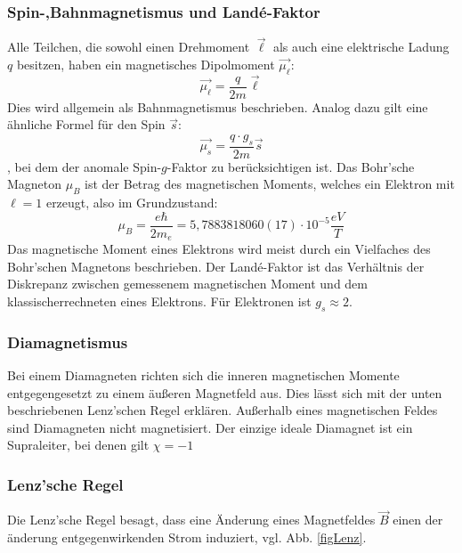         \subsubsection*{Spin-,Bahnmagnetismus und Land\'e-Faktor}
            Alle Teilchen, die sowohl einen Drehmoment $\vec{\ell}$ als auch eine elektrische Ladung $q$ besitzen, haben ein magnetisches Dipolmoment $\vec{\mu_{\ell}}$:
            \begin{equation}
                \vec{\mu_{\ell}} = \frac{q}{2m} \vec{\ell}
            \end{equation}
            Dies wird allgemein als Bahnmagnetismus beschrieben. Analog dazu gilt eine ähnliche Formel für den Spin $\vec{s}$:
            \begin{equation}
                \vec{\mu_s} = \frac{q\cdot g_s}{2m} \vec{s}
            \end{equation},
            bei dem der anomale Spin-$g$-Faktor zu berücksichtigen ist.
            Das Bohr'sche Magneton $\mu_B$ ist der Betrag des magnetischen Moments, welches ein Elektron
            mit $\ell=1$ erzeugt, also im Grundzustand:
            \begin{equation}
                \mu_B = \frac{e \hbar}{2 m_e} = 5,7883818060(17)\cdot 10^{-5} \frac{eV}{T}
            \end{equation}
            Das magnetische Moment eines Elektrons wird meist durch ein Vielfaches des Bohr'schen
            Magnetons beschrieben.
            Der Land\'e-Faktor ist das Verhältnis der Diskrepanz zwischen gemessenem magnetischen Moment
            und dem \dq klassisch\dq errechneten eines Elektrons. Für Elektronen ist $g_s \approx 2$.
        \subsubsection*{Diamagnetismus}
            Bei einem Diamagneten richten sich die inneren magnetischen Momente entgegengesetzt
            zu einem äußeren Magnetfeld aus. Dies lässt sich mit der unten beschriebenen Lenz'schen Regel erklären.
            Außerhalb eines magnetischen Feldes sind Diamagneten
            nicht magnetisiert. Der einzige ideale Diamagnet ist ein Supraleiter, bei denen gilt $\chi = -1$
        \subsubsection*{Lenz'sche Regel}
            Die Lenz'sche Regel besagt, dass eine Änderung eines Magnetfeldes $\vec{B}$ einen der änderung
            entgegenwirkenden Strom induziert, vgl. Abb. \ref{figLenz}.

